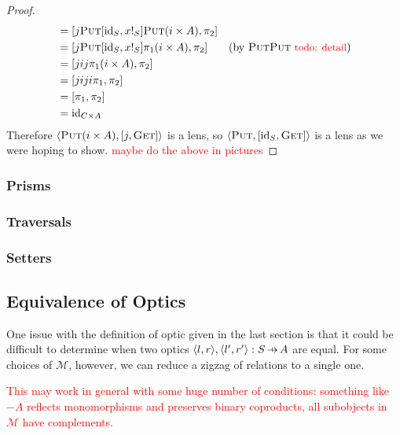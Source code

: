 \documentclass[11pt,a4paper]{article}
\theoremstyle{plain}
\theoremstyle{definition}
\newcommand{\M}{\mathscr{M}}
\newcommand{\id}{\mathrm{id}}
\newcommand{\fget}{\textsc{Get}}
\newcommand{\fput}{\textsc{Put}}
\newcommand{\hto}{\ensuremath{\,\mathaccent\shortmid\rightarrow\,}}
\newcommand{\todo}[1]{\textcolor{red}{\small #1}}
\begin{document}
\begin{proof}
\begin{align*}
&= [j\fput [\id_S,x !_S] \fput (i \times A), \pi_2] && \\
&= [j\fput [\id_S, x !_S] \pi_1 (i \times A), \pi_2] && \text{(by $\fput\fput$ \todo{todo: detail})}\\
&= [jij \pi_1 (i \times A), \pi_2] && \\
&= [jiji \pi_1, \pi_2] && \\
&= [\pi_1, \pi_2] && \\
&= \id_{C \times A}
\end{align*}
Therefore $\langle \fput (i \times A), [j,\fget] \rangle$ is a lens, so  $\langle \fput, [\id_S, \fget] \rangle$ is a lens as we were hoping to show. \todo{maybe do the above in pictures}
\end{proof}

\subsubsection{Prisms}
\subsubsection{Traversals}
\subsubsection{Setters}

\subsection{Equivalence of Optics}

One issue with the definition of optic given in the last section is that it could be difficult to determine when two optics $\langle l, r \rangle, \langle l', r' \rangle : S \hto A$ are equal. For some choices of $\M$, however, we can reduce a zigzag of relations to a single one.

\todo{This may work in general with some huge number of conditions: something like $-A$ reflects monomorphisms and preserves binary coproducts, all subobjects in $\M$ have complements.}
\end{document}
